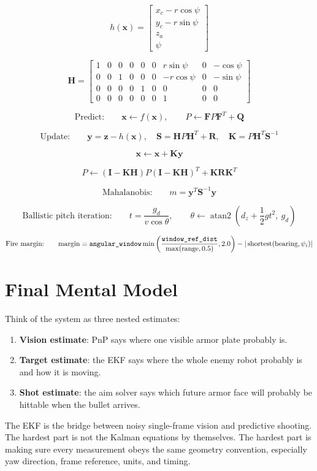 \documentclass[11pt,a4paper]{article}
\newcommand{\code}[1]{\ifmmode\text{\ttfamily\detokenize{#1}}\else\texttt{\detokenize{#1}}\fi}
\newcommand{\vect}[1]{\bm{#1}}
\newcommand{\mat}[1]{\mathbf{#1}}
\begin{document}
\[
h(\vect{x})=
\begin{bmatrix}
x_c-r\cos\psi\\
y_c-r\sin\psi\\
z_a\\
\psi
\end{bmatrix}
\]

\[
\mat{H} =
\begin{bmatrix}
1&0&0&0&0&0&r\sin\psi&0&-\cos\psi\\
0&0&1&0&0&0&-r\cos\psi&0&-\sin\psi\\
0&0&0&0&1&0&0&0&0\\
0&0&0&0&0&0&1&0&0
\end{bmatrix}
\]

\[
\text{Predict:}\qquad
\vect{x}\leftarrow f(\vect{x}),
\qquad
P\leftarrow \mat{F}P\mat{F}^{T}+\mat{Q}
\]

\[
\text{Update:}\qquad
\vect{y}=\vect{z}-h(\vect{x}),
\quad
\mat{S}=\mat{H}P\mat{H}^{T}+\mat{R},
\quad
\mat{K}=P\mat{H}^{T}\mat{S}^{-1}
\]

\[
\vect{x}\leftarrow \vect{x}+\mat{K}\vect{y}
\]

\[
P\leftarrow
(\mat{I}-\mat{K}\mat{H})P(\mat{I}-\mat{K}\mat{H})^{T}
+\mat{K}\mat{R}\mat{K}^{T}
\]

\[
\text{Mahalanobis:}\qquad
m=\vect{y}^{T}\mat{S}^{-1}\vect{y}
\]

\[
\text{Ballistic pitch iteration:}\qquad
t=\frac{g_d}{v\cos\theta},
\qquad
\theta\leftarrow
\operatorname{atan2}\left(d_z+\frac{1}{2}gt^2,\ g_d\right)
\]

\[
\text{Fire margin:}\qquad
\text{margin}=\code{angular_window}
\min\left(\frac{\code{window_ref_dist}}{\max(\text{range},0.5)},2.0\right)
-
|\operatorname{shortest}(\text{bearing},\psi_i)|
\]

\section{Final Mental Model}

Think of the system as three nested estimates:
\begin{enumerate}[leftmargin=1.5em]
  \item \textbf{Vision estimate}: PnP says where one visible armor plate probably is.
  \item \textbf{Target estimate}: the EKF says where the whole enemy robot probably is and how it is moving.
  \item \textbf{Shot estimate}: the aim solver says which future armor face will probably be hittable when the bullet arrives.
\end{enumerate}

The EKF is the bridge between noisy single-frame vision and predictive shooting.
The hardest part is not the Kalman equations by themselves.
The hardest part is making sure every measurement obeys the same geometry convention, especially yaw direction, frame reference, units, and timing.
\end{document}
